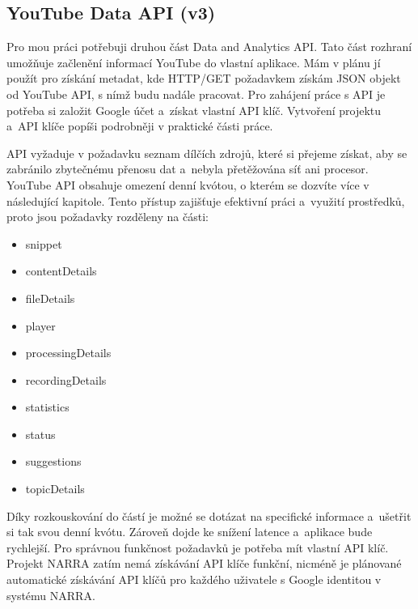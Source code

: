 \subsection{YouTube Data API (v3)}
\par Pro mou práci potřebuji druhou část Data and Analytics API\cite{apistart}\cite{apiv3}. Tato část rozhraní umožňuje začlenění informací YouTube do vlastní aplikace. Mám v plánu jí použít pro získání metadat, kde HTTP/GET požadavkem získám JSON objekt od YouTube API, s nímž budu nadále pracovat. Pro zahájení práce s API je potřeba si založit Google účet a~získat vlastní API klíč. Vytvoření projektu a~API klíče popíši podrobněji v praktické části práce.
\par 
\par API vyžaduje v požadavku seznam dílčích zdrojů, které si přejeme získat, aby se zabránilo zbytečnému přenosu dat a~nebyla přetěžována síť ani procesor. YouTube API obsahuje omezení denní kvótou, o kterém se dozvíte více v následující kapitole. Tento přístup zajišťuje efektivní práci a~využití prostředků, proto jsou požadavky rozděleny na části:
\begin{itemize} 
\item{snippet}
\item{contentDetails}
\item{fileDetails}
\item{player}
\item{processingDetails}
\item{recordingDetails}
\item{statistics}
\item{status}
\item{suggestions}
\item{topicDetails}
\end{itemize}
\par Díky rozkouskování do částí je možné se dotázat na specifické informace a~ušetřit si tak svou denní kvótu. Zároveň dojde ke snížení latence a~aplikace bude rychlejší. Pro správnou funkčnost požadavků je potřeba mít vlastní API klíč. Projekt NARRA zatím nemá získávání API klíče funkční, nicméně je plánované automatické získávání API klíčů pro každého uživatele s Google identitou v systému NARRA.

